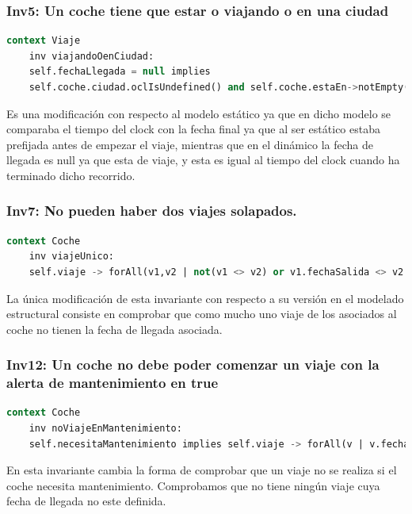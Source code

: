 \documentclass[12pt.a4paper]{article}
\begin{document}
\subsubsection{Inv5: Un coche tiene que estar o viajando o en una ciudad}
    \begin{lstlisting}[style = useEspecifico,language=SQL]
context Viaje
    inv viajandoOenCiudad:
    self.fechaLlegada = null implies
    self.coche.ciudad.oclIsUndefined() and self.coche.estaEn->notEmpty()
    \end{lstlisting}
    Es una modificación con respecto al modelo estático ya que en dicho modelo se comparaba el tiempo del clock con la fecha final ya que al ser estático estaba prefijada antes de empezar el viaje, mientras que en el dinámico la fecha de llegada es null ya que esta de viaje, y esta es igual al tiempo del clock cuando ha terminado dicho recorrido.
    
 \subsubsection{Inv7: No pueden haber dos viajes solapados.}
    \begin{lstlisting}[style = useEspecifico,language=SQL]
context Coche
    inv viajeUnico:
    self.viaje -> forAll(v1,v2 | not(v1 <> v2) or v1.fechaSalida <> v2.fechaSalida and (v1.fechaLlegada <= v2.fechaSalida or v2.fechaLlegada <= v1.fechaSalida) and (not(v1.fechaLlegada = null and v2.fechaLlegada = null)))
    \end{lstlisting}
La única modificación de esta invariante con respecto a su versión en el modelado estructural consiste en comprobar que como mucho uno viaje de los asociados al coche no tienen la fecha de llegada asociada.
    
\subsubsection{Inv12: Un coche no debe poder comenzar un viaje con la alerta de mantenimiento en true}
    \begin{lstlisting}[style = useEspecifico,language=SQL]
context Coche    
    inv noViajeEnMantenimiento:
    self.necesitaMantenimiento implies self.viaje -> forAll(v | v.fechaLlegada <> null)
    \end{lstlisting}
En esta invariante cambia la forma de comprobar que un viaje no se realiza si el coche necesita mantenimiento. Comprobamos que no tiene ningún viaje cuya fecha de llegada no este definida. 
\end{document}
